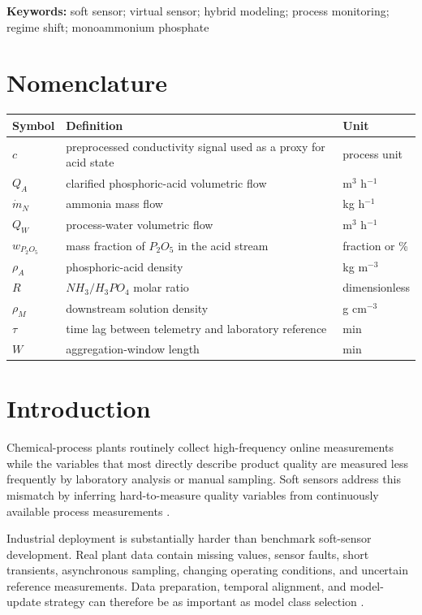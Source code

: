 \documentclass[11pt]{article}
\begin{document}
\noindent\textbf{Keywords:} soft sensor; virtual sensor; hybrid modeling; process monitoring; regime shift; monoammonium phosphate

\section*{Nomenclature}

\begin{tabular}{@{}lll@{}}
\toprule
Symbol & Definition & Unit\\
\midrule
$c$ & preprocessed conductivity signal used as a proxy for acid state & process unit\\
$Q_A$ & clarified phosphoric-acid volumetric flow & m$^3$ h$^{-1}$\\
$\dot m_N$ & ammonia mass flow & kg h$^{-1}$\\
$Q_W$ & process-water volumetric flow & m$^3$ h$^{-1}$\\
$w_{P_2O_5}$ & mass fraction of $P_2O_5$ in the acid stream & fraction or \%\\
$\rho_A$ & phosphoric-acid density & kg m$^{-3}$\\
$R$ & $NH_3/H_3PO_4$ molar ratio & dimensionless\\
$\rho_M$ & downstream solution density & g cm$^{-3}$\\
$\tau$ & time lag between telemetry and laboratory reference & min\\
$W$ & aggregation-window length & min\\
\bottomrule
\end{tabular}

\section{Introduction}

Chemical-process plants routinely collect high-frequency online measurements while the variables that most directly describe product quality are measured less frequently by laboratory analysis or manual sampling. Soft sensors address this mismatch by inferring hard-to-measure quality variables from continuously available process measurements \citep{kadlec2009,souza2016}.

Industrial deployment is substantially harder than benchmark soft-sensor development. Real plant data contain missing values, sensor faults, short transients, asynchronous sampling, changing operating conditions, and uncertain reference measurements. Data preparation, temporal alignment, and model-update strategy can therefore be as important as model class selection \citep{kadlec2009,offermans2024,dai2025}.
\end{document}
